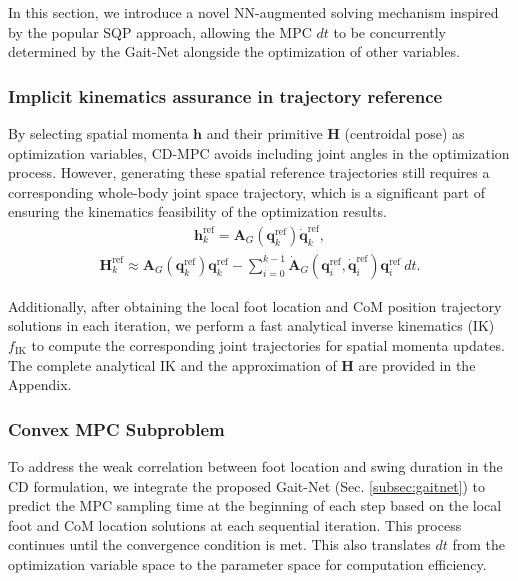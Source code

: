 In this section, we introduce a novel NN-augmented solving mechanism inspired by the popular SQP approach, allowing the MPC $dt$ to be concurrently determined by the Gait-Net alongside the optimization of other variables. 

\subsubsection{Implicit kinematics assurance in trajectory reference}
By selecting spatial momenta $\bm h$ and their primitive $\bm H$ (centroidal pose) as optimization variables, CD-MPC avoids including joint angles in the optimization process. However, generating these spatial reference trajectories still requires a corresponding whole-body joint space trajectory, which is a significant part of ensuring the kinematics feasibility of the optimization results. 
\begin{align}
    \bm h^\text{ref}_k = \bm A_G(\mathbf q^\text{ref}_k)\dot{\mathbf q}^\text{ref}_k,
\end{align}
\begin{equation}
\begin{aligned}
        \bm H^\text{ref}_k
        \approx \bm A_G(\mathbf q^\text{ref}_k)\mathbf q^\text{ref}_k - \sum^{k-1}_{i = 0} \dot{\bm A}_G(\mathbf q^\text{ref}_i,\dot{\mathbf q}^\text{ref}_i)\mathbf q^\text{ref}_i\:dt.
\end{aligned}
\end{equation}

Additionally, after obtaining the local foot location and CoM position trajectory solutions in each iteration, we perform a fast analytical inverse kinematics (IK) $f_\text{IK}$ to compute the corresponding joint trajectories for spatial momenta updates. The complete analytical IK and the approximation of $\bm H$ are provided in the Appendix. 



\subsubsection{Convex MPC Subproblem}
\label{subsubsec:cmpc}
To address the weak correlation between foot location and swing duration in the CD formulation, we integrate the proposed Gait-Net (Sec. \ref{subsec:gaitnet}) to predict the MPC sampling time at the beginning of each step based on the local foot and CoM location solutions at each sequential iteration. This process continues until the convergence condition is met. This also translates $dt$ from the optimization variable space to the parameter space for computation efficiency. 

